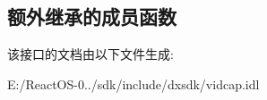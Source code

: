 \subsection*{额外继承的成员函数}


该接口的文档由以下文件生成\+:\begin{DoxyCompactItemize}
\item 
E\+:/\+React\+O\+S-\/0../sdk/include/dxsdk/vidcap.\+idl\end{DoxyCompactItemize}
